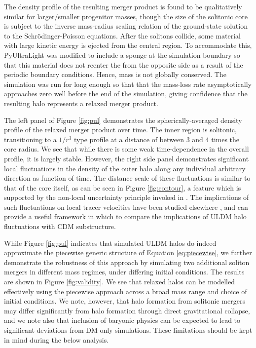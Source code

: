 \documentclass[a4paper,11pt]{article}
\begin{document}
The density profile of the resulting merger product is found to be qualitatively similar for larger/smaller progenitor masses, though the size of the solitonic core is subject to the inverse mass-radius scaling relation of the ground-state solution to the Schr{\"o}dinger-Poisson equations. After the solitons collide, some material with large kinetic energy is ejected from the central region. To accommodate this, {\sc PyUltraLight} was modified to include a sponge at the simulation boundary so that this material does not reenter the from the opposite side as a result of the periodic boundary conditions. Hence, mass is not globally conserved. The simulation was run for long enough so that that the mass-loss rate asymptotically approaches zero well before the end of the simulation, giving confidence that the resulting halo represents a relaxed merger product. 

The left panel of Figure \ref{fig:pul} demonstrates the spherically-averaged density profile of the relaxed merger product over time. The inner region is solitonic, transitioning to a $1/r^3$ type profile at a distance of between 3 and 4 times the core radius. We see that while there is some weak time-dependence in the overall profile, it is largely stable. However, the right side panel demonstrates significant local fluctuations in the density of the outer halo along any individual arbitrary direction as function of time. The distance scale of these fluctuations is similar to that of the core itself, as can be seen in Figure \ref{fig:contour}, a feature which is supported by the non-local uncertainty principle invoked in \cite{Schive:2014hza}. The implications of such fluctuations on local tracer velocities have been studied elsewhere \cite{Marsh:2018zyw}, and can provide a useful framework in which to compare the implications of ULDM halo fluctuations with CDM substructure. 

 
While Figure \ref{fig:pul} indicates that simulated ULDM halos do indeed approximate the piecewise generic structure of Equation \ref{eq:piecewise}, we further demonstrate the robustness of this approach by simulating two additional soliton mergers in different mass regimes, under differing initial conditions. The results are shown in Figure \ref{fig:validity}. We see that relaxed halos can be modelled effectively using the piecewise approach across a broad mass range and choice of initial conditions. We note, however, that halo formation from solitonic mergers may differ significantly from halo formation through direct gravitational collapse, and we note also that inclusion of baryonic physics can be expected to lead to significant deviations from DM-only simulations. These limitations should be kept in mind during the below analysis.
 
\end{document}
